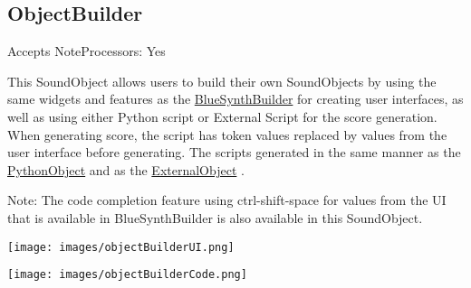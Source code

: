 \subsection{ObjectBuilder}\label{objectBuilder}

Accepts NoteProcessors: Yes

This SoundObject allows users to build their own SoundObjects by using
the same widgets and features as the
\protect\hyperlink{blueSynthBuilder}{BlueSynthBuilder} for creating user
interfaces, as well as using either Python script or External Script for
the score generation. When generating score, the script has token values
replaced by values from the user interface before generating. The
scripts generated in the same manner as the
\protect\hyperlink{pythonObject}{PythonObject} and as the
\protect\hyperlink{externalSoundObject}{ExternalObject} .

Note: The code completion feature using ctrl-shift-space for values from
the UI that is available in BlueSynthBuilder is also available in this
SoundObject.

\texttt{[image: images/objectBuilderUI.png]}

\texttt{[image: images/objectBuilderCode.png]}
